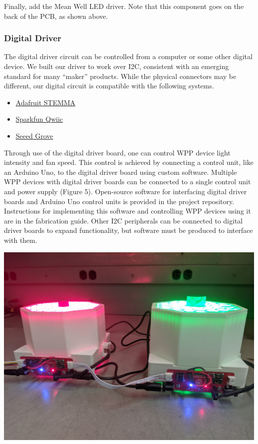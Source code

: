 \documentclass[11pt]{article}
\begin{document}
Finally, add the Mean Well LED driver.
Note that this component goes on the back of the PCB, as shown above.



\subsubsection{Digital Driver} \label{SEC:digital-driver}

The digital driver circuit can be controlled from a computer or some other digital device.
We built our driver to work over I2C, consistent with an emerging standard for many ``maker'' products.
While the physical connectors may be different, our digital circuit is compatible with the following systems.

\begin{itemize}
  \item \href{https://learn.adafruit.com/introducing-adafruit-stemma-qt}{Adafruit STEMMA}
  \item \href{https://www.sparkfun.com/qwiic}{Sparkfun Qwiic}
  \item \href{https://www.seeedstudio.com/category/Grove-c-1003.html}{Seeed Grove}
\end{itemize}

Through use of the digital driver board, one can control WPP device light intensity and fan speed.
This control is achieved by connecting a control unit, like an Arduino Uno, to the digital driver board using custom software.
Multiple WPP devices with digital driver boards can be connected to a single control unit and power supply (Figure 5).
Open-source software for interfacing digital driver boards and Arduino Uno control units is provided in the project repository.
Instructions for implementing this software and controlling WPP devices using it are in the fabrication guide.
Other I2C peripherals can be connected to digital driver boards to expand functionality, but software must be produced to interface with them.

\begin{center}
  \includegraphics[width=\textwidth/2]{"./digital-wired.jpg"}
\end{center}
\end{document}
